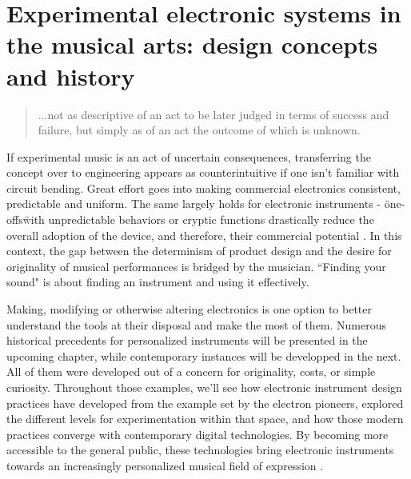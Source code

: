\chapter{Experimental electronic systems in the musical arts: design concepts and history}\label{background}
\begin{quote}
	
	...not as descriptive of an act to be later judged in terms of success and failure, but simply as of an act the outcome of which is unknown. 
	
	\cite[p.13]{cage1961}
	
	\end{quote}
	
If experimental music is an act of uncertain consequences, transferring the concept over to engineering appears as counterintuitive if one isn't familiar with circuit bending. Great effort goes into making commercial electronics consistent, predictable and uniform. The same largely holds for electronic instruments - \"one-offs\" with unpredictable behaviors or cryptic functions drastically reduce the overall adoption of the device, and therefore, their commercial potential \cite[p.5]{haslett2005}. In this context, the gap between the determinism of product design and the desire for originality of musical performances is bridged by the musician. ``Finding your sound" is about finding an instrument and using it effectively.  

Making, modifying or otherwise altering electronics is one option to better understand the tools at their disposal and make the most of them. Numerous historical precedents for personalized instruments will be presented in the upcoming chapter, while contemporary instances will be developped in the next. All of them were developed out of a concern for originality, costs, or simple curiosity. Throughout those examples, we'll see how electronic instrument design practices have developed from the example set by the electron pioneers, explored the different levels for experimentation within that space, and how those modern practices converge with contemporary digital technologies. By becoming more accessible to the general public, these technologies bring electronic instruments towards an increasingly personalized musical field of expression \cite{hermans2014}.


